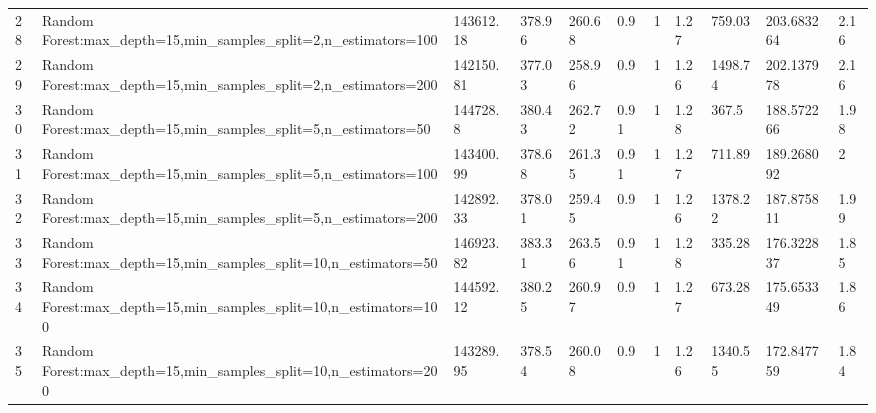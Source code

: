 \begin{longtable}{C{0.8cm} L{2cm} C{1.15cm} C{1.15cm} C{1.15cm} C{1.15cm} C{0.85cm} C{1.25cm} C{1.2cm} C{1.5cm} C{1.0cm}}
28 & Random Forest:\newline max\_depth=15,\newline min\_samples\_split=2,\newline n\_estimators=100 & 143612.18 & 378.96 & 260.68 & 0.9 & 1 & 1.27 & 759.03 & 203.683264 & 2.16 \\
29 & Random Forest:\newline max\_depth=15,\newline min\_samples\_split=2,\newline n\_estimators=200 & 142150.81 & 377.03 & 258.96 & 0.9 & 1 & 1.26 & 1498.74 & 202.137978 & 2.16 \\
30 & Random Forest:\newline max\_depth=15,\newline min\_samples\_split=5,\newline n\_estimators=50 & 144728.8 & 380.43 & 262.72 & 0.91 & 1 & 1.28 & 367.5 & 188.572266 & 1.98 \\
31 & Random Forest:\newline max\_depth=15,\newline min\_samples\_split=5,\newline n\_estimators=100 & 143400.99 & 378.68 & 261.35 & 0.91 & 1 & 1.27 & 711.89 & 189.268092 & 2 \\
32 & Random Forest:\newline max\_depth=15,\newline min\_samples\_split=5,\newline n\_estimators=200 & 142892.33 & 378.01 & 259.45 & 0.9 & 1 & 1.26 & 1378.22 & 187.875811 & 1.99 \\
33 & Random Forest:\newline max\_depth=15,\newline min\_samples\_split=10,\newline n\_estimators=50 & 146923.82 & 383.31 & 263.56 & 0.91 & 1 & 1.28 & 335.28 & 176.322837 & 1.85 \\
34 & Random Forest:\newline max\_depth=15,\newline min\_samples\_split=10,\newline n\_estimators=100 & 144592.12 & 380.25 & 260.97 & 0.9 & 1 & 1.27 & 673.28 & 175.653349 & 1.86 \\
35 & Random Forest:\newline max\_depth=15,\newline min\_samples\_split=10,\newline n\_estimators=200 & 143289.95 & 378.54 & 260.08 & 0.9 & 1 & 1.26 & 1340.55 & 172.847759 & 1.84 \\

\end{longtable}
